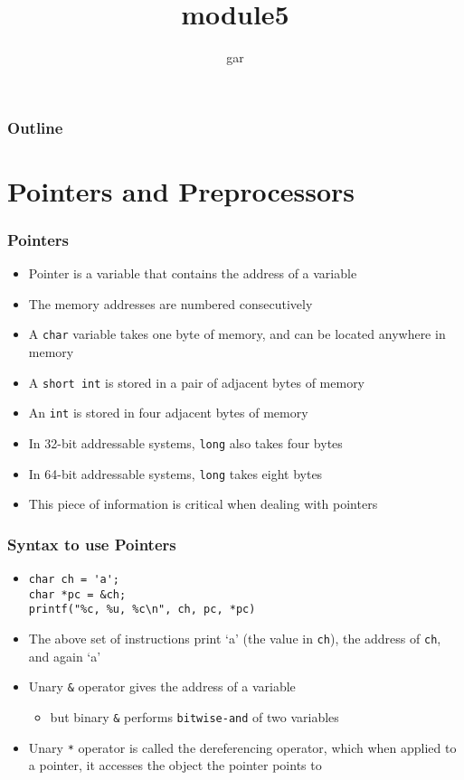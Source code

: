 \documentclass[11pt]{beamer}
\title{module5}
\author{gar}
\date{}
\begin{document}
\maketitle

\begin{frame}
\frametitle{Outline}
\setcounter{tocdepth}{3}
\tableofcontents
\end{frame}
\section{Pointers and Preprocessors}
\label{sec-1}
\begin{frame}[fragile]\frametitle{Pointers}
\label{sec-1-1}

\begin{itemize}
\item Pointer is a variable that contains the address of a variable
\item The memory addresses are numbered consecutively
\item A \verb~char~ variable takes one byte of memory, and can be located anywhere in memory
\item A \verb~short int~ is stored in a pair of adjacent bytes of memory
\item An \verb~int~ is stored in four adjacent bytes of memory
\item In 32-bit addressable systems, \verb~long~ also takes four bytes
\item In 64-bit addressable systems, \verb~long~ takes eight bytes
\item This piece of information is critical when dealing with pointers
\end{itemize}
\end{frame}
\begin{frame}[fragile]\frametitle{Syntax to use Pointers}
\label{sec-1-2}

\begin{itemize}
\item \begin{verbatim}
char ch = 'a';
char *pc = &ch;
printf("%c, %u, %c\n", ch, pc, *pc)
\end{verbatim}
\item The above set of instructions print `a' (the value in \verb~ch~), the address of \verb~ch~, and again `a'
\item Unary \verb~&~ operator gives the address of a variable
\begin{itemize}
\item but binary \verb~&~ performs \verb~bitwise-and~ of two variables
\end{itemize}
\item Unary \verb~*~ operator is called the dereferencing operator, which when applied to a pointer, it accesses the object the pointer points to
\end{itemize}
\end{frame}
\end{document}
